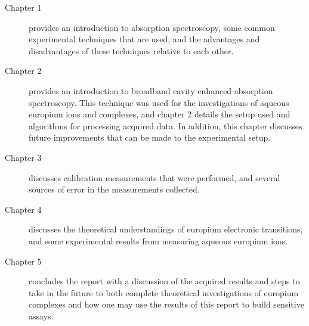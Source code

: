 \begin{description}
  \item[Chapter 1] provides an introduction to absorption spectroscopy, some
                   common experimental techniques that are used, and the
                   advantages and disadvantages of these techniques relative to
                   each other.
  \item[Chapter 2] provides an introduction to broadband cavity enhanced
                   absorption spectroscopy. This technique was used for the
                   investigations of aqueous europium ions and complexes, and
                   chapter 2 details the setup used and algorithms for
                   processing acquired data. In addition, this chapter
                   discusses future improvements that can be made to the
                   experimental setup.
  \item[Chapter 3] discusses calibration measurements that were performed, and
                   several sources of error in the measurements collected.
  \item[Chapter 4] discusses the theoretical understandings of europium
                   electronic transitions, and some experimental results from
                   measuring aqueous europium ions.
  \item[Chapter 5] concludes the report with a discussion of the acquired
                   results and steps to take in the future to both complete
                   theoretical investigations of europium complexes and how one
                   may use the results of this report to build sensitive assays.
\end{description}
